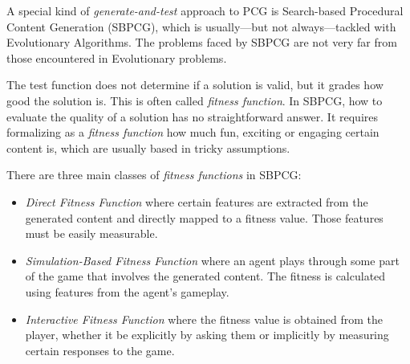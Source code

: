 A special kind of \textit{generate-and-test} approach to PCG is Search-based Procedural Content Generation (SBPCG), which is usually---but not always---tackled with Evolutionary Algorithms. The problems faced by SBPCG are not very far from those encountered in Evolutionary problems. 

The test function does not determine if a solution is valid, but it grades how good the solution is. This is often called \textit{fitness function}. In SBPCG, how to evaluate the quality of a solution has no straightforward answer. It requires formalizing as a \textit{fitness function} how much fun, exciting or engaging certain content is, which are usually based in tricky assumptions.

There are three main classes of \textit{fitness functions} in SBPCG\cite{togelius2010search}:

\begin{itemize}
	\item \textit{Direct Fitness Function} where certain features are extracted from the generated content and directly mapped to a fitness value. Those features must be easily measurable.
	\item \textit{Simulation-Based Fitness Function} where an agent plays through some part of the game that involves the generated content. The fitness is calculated using features from the agent's gameplay. 
	
	\item \textit{Interactive Fitness Function} where the fitness value is obtained from the player, whether it be explicitly by asking them or implicitly by measuring certain responses to the game. 
\end{itemize}



